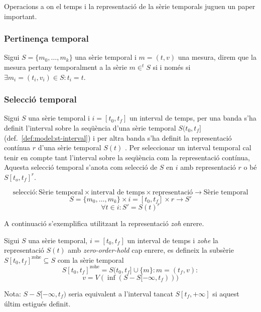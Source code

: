 Operacions a on el temps i la representació de la sèrie temporals
juguen un paper important.


\subsubsection{Pertinença temporal}

\begin{definition}
  Sigui $S=\{m_0, \dotsc, m_{k}\}$ una sèrie temporal i $m=(t,v)$ una
  mesura, direm que la mesura pertany temporalment a la sèrie 
  $m\in^t S$ si i només si $\exists m_i=(t_i,v_i)\in S: t_i=t$.
\end{definition}





\subsubsection{Selecció temporal}

Sigui $S$ una sèrie temporal i $i=[t_0,t_f]$ un interval de temps,
per una banda s'ha definit l'interval sobre la seqüència d'una sèrie temporal $S(t_0,t_f]$ (def.~\ref{def:model:st-interval})  i per altra banda s'ha definit la representació contínua $r$ d'una sèrie temporal $S(t)$ .
Per seleccionar un interval temporal cal tenir en compte tant l'interval sobre la seqüència com la representació contínua, Aquesta selecció temporal s'anota com selecció de $S$ en $i$ amb representació $r$ o bé $S[t_o,t_f]^r$. 

\begin{definition}
  \[
  \text{selecció}: \text{Sèrie temporal} \times \text{interval de
    temps} \times \text{representació} \longrightarrow \text{Sèrie
    temporal}
  \]
  \[
  S = \{m_0 , \ldots , m_k\}  \times i = [t_0,t_f] \times r \longrightarrow S'
  \]
  \[
  \forall  t \in i: S' = S(t)^r 
  \] 
\end{definition}

A continuació s'exemplifica utilitzant la representació \emph{zoh} enrere.


\begin{definition}
  Sigui $S$ una sèrie temporal, $i=[t_0,t_f]$ un interval de temps i
  \emph{zohe} la representació $S(t)$ amb \emph{zero-order-hold} cap
  enrere, es defineix la subsèrie $S[t_0,t_f]^{\text{zohe}}\subseteq
  S$ com la sèrie temporal 
  \[
  S[t_0,t_f]^{\text{zohe}} = S(t_0,t_f] \cup \{m\} : m=(t_f,v):
  \]
  \[
  v=  V(\inf(S-S[-\infty,t_f)))
  \]

  
  Nota: $S-S[-\infty,t_f)$ seria equivalent a l'interval tancat
  $S[t_f,+\infty]$ si aquest últim estigués definit.
\end{definition}


